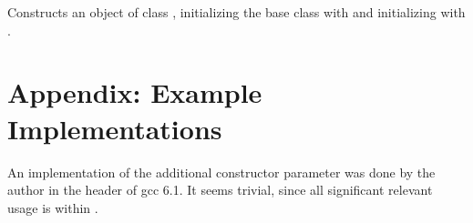 \documentclass[ebook,11pt,article]{memoir}
\begin{document}
\begin{itemdescr}
\pnum
\effects
Constructs an object of class
,
initializing the base class with
and initializing
with
.
\end{itemdescr}



\chapter{Appendix: Example Implementations}
An implementation of the additional constructor parameter was done by the author in the  header of gcc 6.1. It seems trivial, since all significant relevant usage is within . 
\end{document}
